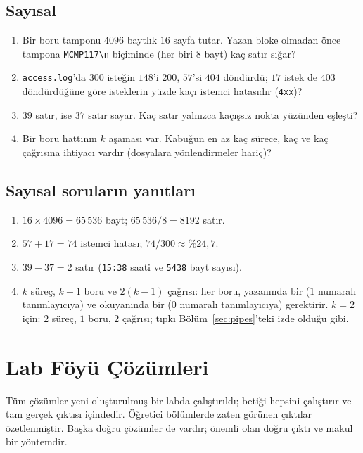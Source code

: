 \subsection*{Sayısal}
\begin{enumerate}[leftmargin=1.6em,resume]
  \item Bir boru tamponu $4096$ baytlık $16$ sayfa tutar. Yazan bloke olmadan önce tampona \texttt{MCMP117\textbackslash n} biçiminde (her biri $8$ bayt) kaç satır sığar?
  \item \texttt{access.log}'da $300$ isteğin $148$'i $200$, $57$'si $404$ döndürdü; $17$ istek de $403$ döndürdüğüne göre isteklerin yüzde kaçı istemci hatasıdır (\texttt{4xx})?
  \item {} $39$ satır,  ise $37$ satır sayar. Kaç satır yalnızca kaçışsız nokta yüzünden eşleşti?
  \item Bir boru hattının $k$ aşaması var. Kabuğun en az kaç sürece, kaç  ve kaç  çağrısına ihtiyacı vardır (dosyalara yönlendirmeler hariç)?
\end{enumerate}

\subsection*{Sayısal soruların yanıtları}
\begin{enumerate}[leftmargin=1.6em,start=9]
  \item $16 \times 4096 = 65\,536$ bayt; $65\,536 / 8 = 8192$ satır.
  \item $57 + 17 = 74$ istemci hatası; $74/300 \approx \%24{,}7$.
  \item $39 - 37 = 2$ satır (\texttt{15:38} saati ve \texttt{5438} bayt sayısı).
  \item $k$ süreç, $k-1$ boru ve $2(k-1)$  çağrısı: her boru, yazanında bir  ($1$ numaralı tanımlayıcıya) ve okuyanında bir  ($0$ numaralı tanımlayıcıya) gerektirir. $k = 2$ için: $2$ süreç, $1$ boru, $2$  çağrısı; tıpkı Bölüm~\ref{sec:pipes}'teki izde olduğu gibi.
\end{enumerate}

\section{Lab Föyü Çözümleri}
\label{sec:sol}

Tüm çözümler yeni oluşturulmuş bir labda çalıştırıldı;  betiği hepsini çalıştırır ve tam gerçek çıktısı  içindedir. Öğretici bölümlerde zaten görünen çıktılar özetlenmiştir. Başka doğru çözümler de vardır; önemli olan doğru çıktı ve makul bir yöntemdir.

